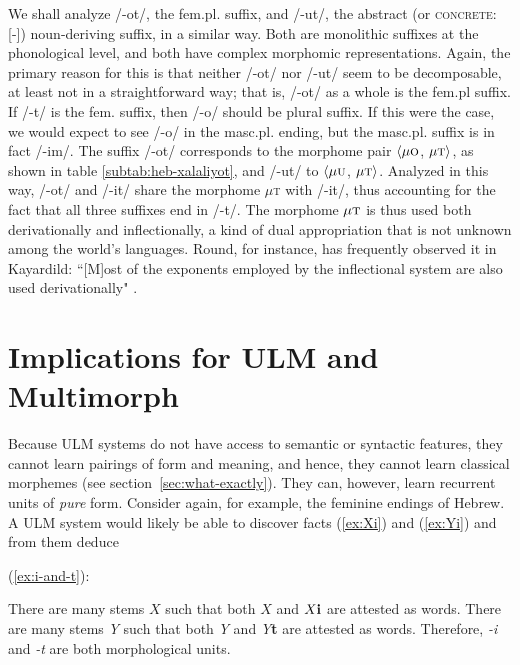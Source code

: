  We shall analyze /-ot/, the fem.pl. suffix, and /-ut/, the abstract (or \textsc{concrete:}[-])
 noun-deriving suffix, in a similar way. Both are monolithic suffixes at the phonological
 level, and both have complex morphomic representations. Again, the primary reason for this
 is that neither /-ot/ nor /-ut/ seem to be decomposable, at least not in a straightforward
 way; that is, /-ot/ as a whole is the fem.pl suffix. If /-t/ is the fem. suffix, then
 /-o/ should be plural suffix. If this were the case, we would expect to see
 /-o/ in the masc.pl. ending, but the masc.pl. suffix is in fact /-im/. The suffix /-ot/
 corresponds to the morphome pair $\langle \mu\textsc{o}$, $\mu\textsc{t} \rangle$, 
 as shown in table \ref{subtab:heb-xalaliyot}, and /-ut/ to $\langle \mu\textsc{u}$, 
 $\mu\textsc{t} \rangle$. Analyzed in this way, /-ot/ and /-it/ share the morphome 
 $\mu$\textsc{t} with /-it/, thus accounting for the fact that all three suffixes end 
 in /-t/. The morphome $\mu\textsc{t}$ is thus used both derivationally and 
 inflectionally, a kind of dual appropriation that is not unknown among the world's languages. 
 Round, for instance, has frequently observed it in Kayardild: ``[M]ost of the exponents 
 employed by the inflectional system are also used derivationally" \citep[][p. 13]{round:2015}.

\section{Implications for \ac{ULM}  and Multimorph}

Because \ac{ULM} systems do not have access to
semantic or syntactic features, they cannot learn pairings of form and meaning, 
and hence, they cannot learn classical morphemes (see section~\ref{sec:what-exactly}). 
They can, however, learn recurrent units of \emph{pure} form. 
Consider again, 
for example, the feminine endings of Hebrew. A \ac{ULM} system would likely be 
able to discover facts (\ref{ex:Xi}) and (\ref{ex:Yi}) and from them deduce 

(\ref{ex:i-and-t}): 
\begin{exe} \label{ex:observations1}
\ex There are many stems $X$ such that both $X$ and $X\text{\textbf{i}}$ are 
attested as words. \label{ex:Xi}
 \ex There are many stems \textit{Y} such that both \textit{Y} and \textit{Y}\textbf{t} 
 are attested as words. \label{ex:Yi}
\ex Therefore, \textit{-i} and \textit{-t} are both morphological units. \label{ex:i-and-t}
\end{exe}

